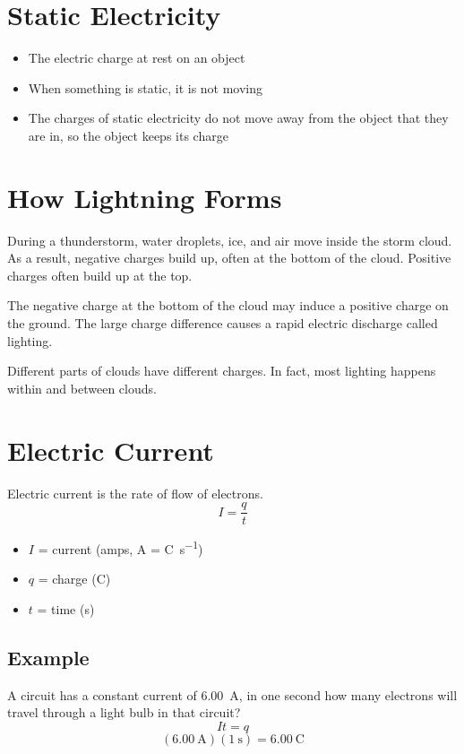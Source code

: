 \documentclass[a4paper,12pt]{article}
\begin{document}
\section{Static Electricity}
\begin{itemize}
    \item{The electric charge at rest on an object}
    \item{When something is static, it is not moving}
    \item{The charges of static electricity do not move away from the object that they are in, so the object keeps its charge}
\end{itemize}

\section{How Lightning Forms}
During a thunderstorm, water droplets, ice, and air move inside the storm cloud. As a result, negative charges build up, often at the bottom of the cloud. Positive charges often build up at the top.

The negative charge at the bottom of the cloud may induce a positive charge on the ground. The large charge difference causes a rapid electric discharge called lighting.

Different parts of clouds have different charges. In fact, most lighting happens within and between clouds.

\section{Electric Current}
Electric current is the rate of flow of electrons.
\Large $$I = \frac{q}{t}$$ \normalsize
\begin{itemize}
    \item{$I$ = current (amps, \si{\ampere} = \si{\coulomb\per\s})}
    \item{$q$ = charge (\si{\coulomb})}
    \item{$t$ = time (\si{\s})}
\end{itemize}

\subsection{Example}
A circuit has a constant current of \SI{6.00}{\ampere}, in one second how many electrons will travel through a light bulb in that circuit?
$$It = q$$
$$(\SI{6.00}{\ampere})(\SI{1}{\s}) = \SI{6.00}{\coulomb}$$
\end{document}
